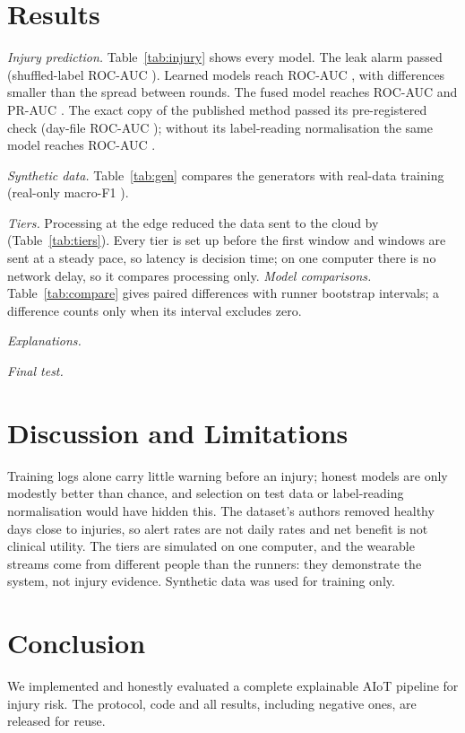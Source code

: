\documentclass[conference]{IEEEtran}
\begin{document}
\section{Results}

\textit{Injury prediction.} Table~\ref{tab:injury} shows every model. The leak alarm passed
(shuffled-label ROC-AUC \canaryAuc{}). Learned models reach ROC-AUC \injuryAucRange{}, with
differences smaller than the spread between rounds. The fused model reaches ROC-AUC
\fusedAuc{} and PR-AUC \fusedPrAuc{}. The exact copy of the published method passed its
pre-registered check (day-file ROC-AUC \reproDayAuc{}); without its label-reading normalisation
the same model reaches ROC-AUC .


\textit{Synthetic data.} Table~\ref{tab:gen} compares the generators with real-data training
(real-only macro-F1 \pamapRealFone{}). \wesadSummary{} \augmentSummary{}



\textit{Tiers.} Processing at the edge reduced the data sent to the cloud by \tiersReduction{}
(Table~\ref{tab:tiers}). Every tier is set up before the first window and windows are sent at a
steady pace, so latency is decision time; on one computer there is no network delay, so it
compares processing only.
\textit{Model comparisons.} Table~\ref{tab:compare} gives paired differences with runner
bootstrap intervals; a difference counts only when its interval excludes zero.

\textit{Explanations.} \explainSummary{}

\textit{Final test.} \lockboxSummary{}

\section{Discussion and Limitations}
Training logs alone carry little warning before an injury; honest models are only modestly
better than chance, and selection on test data or label-reading normalisation would have hidden
this. The dataset's authors removed healthy days close to injuries, so alert rates are not daily
rates and net benefit is not clinical utility. The tiers are simulated on one computer, and the
wearable streams come from different people than the runners: they demonstrate the system, not
injury evidence. Synthetic data was used for training only.

\section{Conclusion}
We implemented and honestly evaluated a complete explainable AIoT pipeline for injury risk.
The protocol, code and all results, including negative ones, are released for reuse.
\end{document}
